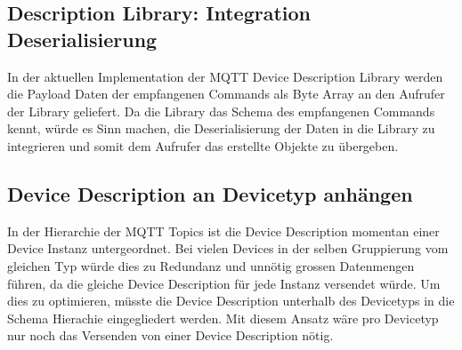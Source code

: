 \subsection{Description Library: Integration Deserialisierung}
In der aktuellen Implementation der MQTT Device Description Library werden die Payload Daten der empfangenen Commands als Byte Array an den Aufrufer der Library geliefert.
Da die Library das Schema des empfangenen Commands kennt, würde es Sinn machen, die Deserialisierung der Daten in die Library zu integrieren und somit dem Aufrufer das erstellte Objekte zu übergeben.

\subsection{Device Description an Devicetyp anhängen}
In der Hierarchie der MQTT Topics ist die Device Description momentan einer Device Instanz untergeordnet. Bei vielen Devices in der selben Gruppierung vom gleichen Typ würde dies zu Redundanz und unnötig grossen Datenmengen führen, da die gleiche Device Description für jede Instanz versendet würde. Um dies zu optimieren, müsste die Device Description unterhalb des Devicetyps in die Schema Hierachie eingegliedert werden. Mit diesem Ansatz wäre pro Devicetyp nur noch das Versenden von einer Device Description nötig.
